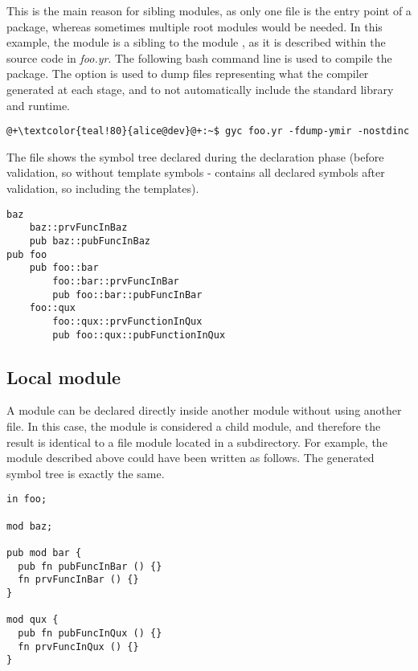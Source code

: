 This is the main reason for sibling modules, as only one file is the entry point
of a package, whereas sometimes multiple root modules would be needed. In this
example, the module  is a sibling to the module , as it is
described within the source code in \textit{foo.yr}. The following bash command
line is used to compile the package. The  option is used to
dump files representing what the compiler generated at each stage, and
 to not automatically include the standard library and runtime.

\begin{lstlisting}[style=bashVerb, escapechar=@+]
@+\textcolor{teal!80}{alice@dev}@+:~$ gyc foo.yr -fdump-ymir -nostdinc
\end{lstlisting}

The file  shows the symbol tree declared during the
declaration phase (before validation, so without template symbols -
 contains all declared symbols after validation, so
including the templates).

\begin{lstlisting}[style=bashVerb, escapechar=@+]
baz
    baz::prvFuncInBaz
    pub baz::pubFuncInBaz
pub foo
    pub foo::bar
        foo::bar::prvFuncInBar
        pub foo::bar::pubFuncInBar
    foo::qux
        foo::qux::prvFunctionInQux
        pub foo::qux::pubFunctionInQux
\end{lstlisting}

\subsection{Local module}

A module can be declared directly inside another module without using another
file. In this case, the module is considered a child module, and therefore the
result is identical to a file module located in a subdirectory. For example, the
 module described above could have been written as follows. The
generated symbol tree is exactly the same.

\begin{lstlisting}[caption=\textit{./foo.yr}, style=coloredverbatim]
in foo;

mod baz;

pub mod bar {
  pub fn pubFuncInBar () {}
  fn prvFuncInBar () {}
}

mod qux {
  pub fn pubFuncInQux () {}
  fn prvFuncInQux () {}
}
\end{lstlisting}

